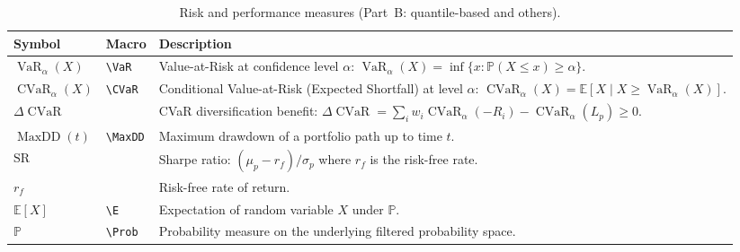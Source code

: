 \documentclass[12pt,openany]{book}
\newcommand{\E}{\mathbb{E}}
\newcommand{\Prob}{\mathbb{P}}
\DeclareMathOperator{\CVaR}{CVaR}
\DeclareMathOperator{\VaR}{VaR}
\DeclareMathOperator{\MaxDD}{MaxDD}
\numberwithin{equation}{chapter}
\theoremstyle{plain}
\theoremstyle{definition}
\theoremstyle{remark}
\renewcommand{\arraystretch}{1.2}
\begin{document}
\begin{table}[H]
\renewcommand{\arraystretch}{1.35}
\caption{Risk and performance measures (Part~B: quantile-based and others).}
\label{tab:symbols-risk-B}
\begin{tabularx}{\linewidth}{@{} l l X @{}}
\toprule
\textbf{Symbol} & \textbf{Macro} & \textbf{Description} \\
\midrule
$\VaR_\alpha(X)$ & \texttt{\textbackslash VaR} &
  Value-at-Risk at confidence level $\alpha$:
  $\VaR_\alpha(X)=\inf\{x:\Prob(X\leq x)\geq\alpha\}$. \\
$\CVaR_\alpha(X)$ & \texttt{\textbackslash CVaR} &
  Conditional Value-at-Risk (Expected Shortfall) at level $\alpha$:
  $\CVaR_\alpha(X)=\E[X\mid X\geq\VaR_\alpha(X)]$. \\
$\Delta\CVaR$ & &
  CVaR diversification benefit:
  $\Delta\CVaR=\sum_i w_i\CVaR_\alpha(-R_i)-\CVaR_\alpha(L_p)\geq0$. \\
$\MaxDD(t)$ & \texttt{\textbackslash MaxDD} &
  Maximum drawdown of a portfolio path up to time $t$. \\
$\mathrm{SR}$ & &
  Sharpe ratio: $(\mu_p - r_f)/\sigma_p$ where $r_f$ is the risk-free rate. \\
$r_f$ & &
  Risk-free rate of return. \\
$\E[X]$ & \texttt{\textbackslash E} &
  Expectation of random variable $X$ under $\Prob$. \\
$\Prob$ & \texttt{\textbackslash Prob} &
  Probability measure on the underlying filtered probability space. \\
\bottomrule
\end{tabularx}
\end{table}
\end{document}
